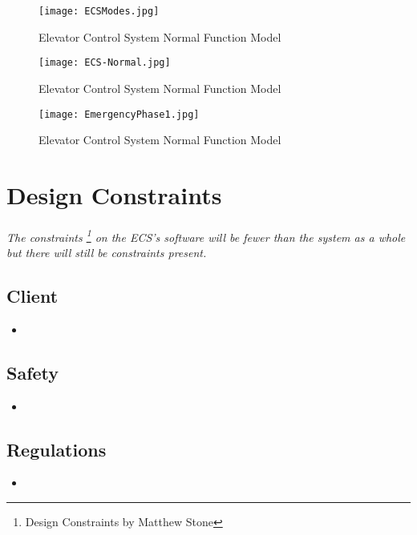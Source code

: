 \documentclass[12pt]{article}
\begin{document}
		\begin{figure}[ht]
  			\centerline{\texttt{[image: ECSModes.jpg]}}
  			\caption{Elevator Control System Normal Function Model }
  			\label{fig:normal}
		\end{figure}

		\begin{figure}[ht]
  			\centerline{\texttt{[image: ECS-Normal.jpg]}}
  			\caption{Elevator Control System Normal Function Model }
  			\label{fig:normal}
		\end{figure}
	
		\begin{figure}[ht]
  			\centerline{\texttt{[image: EmergencyPhase1.jpg]}}
  			\caption{Elevator Control System Normal Function Model }
  			\label{fig:emerg}
		\end{figure}

\section{Design Constraints} \label{cons} %
	\paragraph{} \textit{The constraints \footnote{Design Constraints by Matthew Stone} on the ECS’s software will be fewer than the system 
	as a whole but there will still be constraints present.}

	\subsection{Client}
	\begin{itemize}
		\item 
	\end{itemize}

	\subsection{Safety}
	\begin{itemize}
		\item 
	\end{itemize}

	\subsection{Regulations}
	\begin{itemize}
		\item 
	\end{itemize}
\end{document}
